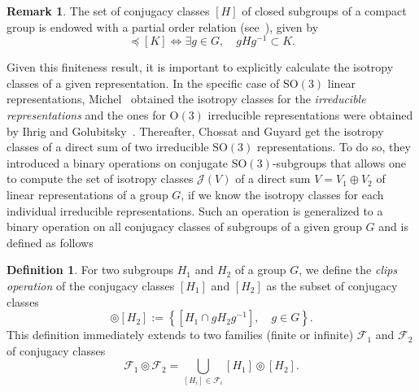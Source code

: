 \documentclass[11pt,a4paper]{amsart}
\theoremstyle{definition}
\newtheorem{defn}[thm]{Definition}
\newtheorem{rem}[thm]{Remark}
\newcommand{\J}{\mathcal{J}}                %
\newcommand{\OO}{\mathrm{O}}                %
\newcommand{\SO}{\mathrm{SO}}               %
\newcommand{\1}{\mathds{1}}		            %
\newcommand{\set}[1]{\left\{#1\right\}}     %
\begin{document}
\begin{rem}
  The set of conjugacy classes $[H]$ of closed subgroups of a compact group is endowed with a partial order relation (see~\cite{bredon1972introduction}), given by
  \begin{equation*}
    [H]\preceq [K]\iff \exists g\in G,\quad gHg^{-1}\subset K.
  \end{equation*}
\end{rem}
Given this finiteness result, it is important to explicitly calculate the isotropy classes of a given representation. In the specific case of $\SO(3)$ linear representations, Michel~\cite{Michel1980} obtained the isotropy classes for the \emph{irreducible representations} and the ones for $\OO(3)$ irreducible representations were obtained by Ihrig and Golubitsky~\cite{Ihrig1984}.
Thereafter, Chossat and Guyard \cite{Chossat1994} get the isotropy classes of a direct sum of two irreducible $\SO(3)$ representations. To do so, they introduced a binary operations on conjugate $\SO(3)$-subgroups that allows one to compute the set of isotropy classes $\J(V)$ of a direct sum $V = V_1\oplus V_2$ of linear representations of a group $G$, if we know the isotropy classes for each individual irreducible representations. Such an operation is generalized to a binary operation on all conjugacy classes of subgroups of a given group $G$ and is defined as follows

\begin{defn}\label{def:clips_operation}
  For two subgroups $H_1$ and $H_2$ of a group $G$, we define the \emph{clips operation} of the conjugacy classes $[H_1]$ and $[H_2]$ as the subset of conjugacy classes
  \begin{equation*}
    [H_1]\circledcirc [H_2]:=\set{[H_1\cap gH_2g^{-1}],\quad g\in G}.
  \end{equation*}
  This definition immediately extends to two families (finite or infinite) $\mathcal{F}_1$ and $\mathcal{F}_2$ of conjugacy classes
  \begin{equation*}
    \mathcal{F}_1 \circledcirc \mathcal{F}_2=\underset{[H_i]\in \mathcal{F}_i}{\bigcup} [H_1]\circledcirc [H_2].
  \end{equation*}
\end{defn}
\end{document}

